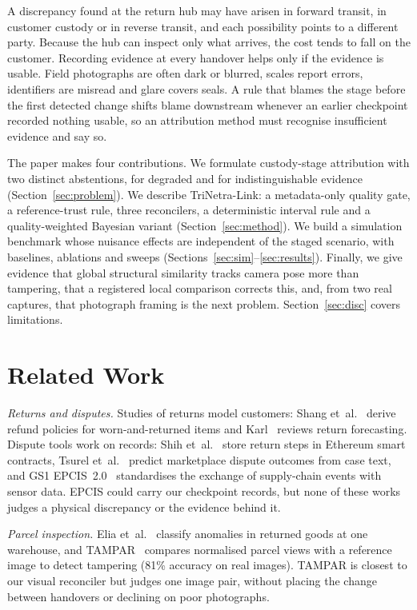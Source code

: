 \documentclass[conference]{IEEEtran}
\begin{document}
A discrepancy found at the return hub may have arisen in forward transit, in customer custody or in reverse transit, and each possibility points to a different party. Because the hub can inspect only what arrives, the cost tends to fall on the customer. Recording evidence at every handover helps only if the evidence is usable. Field photographs are often dark or blurred, scales report errors, identifiers are misread and glare covers seals. A rule that blames the stage before the first detected change shifts blame downstream whenever an earlier checkpoint recorded nothing usable, so an attribution method must recognise insufficient evidence and say so.

The paper makes four contributions. We formulate custody-stage attribution with two distinct abstentions, for degraded and for indistinguishable evidence (Section~\ref{sec:problem}). We describe TriNetra-Link: a metadata-only quality gate, a reference-trust rule, three reconcilers, a deterministic interval rule and a quality-weighted Bayesian variant (Section~\ref{sec:method}). We build a simulation benchmark whose nuisance effects are independent of the staged scenario, with baselines, ablations and sweeps (Sections~\ref{sec:sim}--\ref{sec:results}). Finally, we give evidence that global structural similarity tracks camera pose more than tampering, that a registered local comparison corrects this, and, from two real captures, that photograph framing is the next problem. Section~\ref{sec:disc} covers limitations.

\section{Related Work}
\emph{Returns and disputes.} Studies of returns model customers: Shang et~al.~\cite{shang} derive refund policies for worn-and-returned items and Karl~\cite{karl} reviews return forecasting. Dispute tools work on records: Shih et~al.~\cite{shih} store return steps in Ethereum smart contracts, Tsurel et~al.~\cite{tsurel} predict marketplace dispute outcomes from case text, and GS1 EPCIS~2.0~\cite{epcis} standardises the exchange of supply-chain events with sensor data. EPCIS could carry our checkpoint records, but none of these works judges a physical discrepancy or the evidence behind it.

\emph{Parcel inspection.} Elia et~al.~\cite{elia} classify anomalies in returned goods at one warehouse, and TAMPAR~\cite{tampar} compares normalised parcel views with a reference image to detect tampering (81\% accuracy on real images). TAMPAR is closest to our visual reconciler but judges one image pair, without placing the change between handovers or declining on poor photographs.
\end{document}

